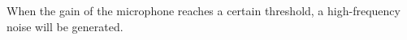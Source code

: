 When the gain of the microphone reaches a certain threshold, a high-frequency noise will be generated.